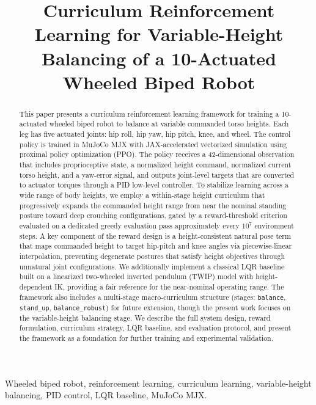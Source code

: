 \documentclass[conference]{IEEEtran}
\title{Curriculum Reinforcement Learning for Variable-Height Balancing of a 10-Actuated Wheeled Biped Robot}
\author{
\IEEEauthorblockN{Van Thuong Nguyen}
\IEEEauthorblockA{
Independent Researcher\\
Email: vanthuong180702t@gmail.com
}
}
\begin{document}
\maketitle

\begin{abstract}
This paper presents a curriculum reinforcement learning framework for training a 10-actuated wheeled biped robot to balance at variable commanded torso heights.
Each leg has five actuated joints: hip roll, hip yaw, hip pitch, knee, and wheel.
The control policy is trained in MuJoCo MJX with JAX-accelerated vectorized simulation
using proximal policy optimization (PPO).
The policy receives a 42-dimensional observation that includes proprioceptive state,
a normalized height command, normalized current torso height, and a yaw-error
signal, and outputs joint-level targets that are converted to actuator torques
through a PID low-level controller.
To stabilize learning across a wide range of body heights, we employ a within-stage
height curriculum that progressively expands the commanded height range from
near the nominal standing posture toward deep crouching configurations, gated
by a reward-threshold criterion evaluated on a dedicated greedy evaluation pass
approximately every $10^7$ environment steps.
A key component of the reward design is a height-consistent natural pose term
that maps commanded height to target hip-pitch and knee angles via
piecewise-linear interpolation, preventing degenerate postures that satisfy
height objectives through unnatural joint configurations.
We additionally implement a classical LQR baseline built on a linearized
two-wheeled inverted pendulum (TWIP) model with height-dependent IK,
providing a fair reference for the near-nominal operating range.
The framework also includes a multi-stage macro-curriculum structure
(stages: \texttt{balance}, \texttt{stand\_up}, \texttt{balance\_robust})
for future extension, though the present work focuses on the variable-height
balancing stage.
We describe the full system design, reward formulation, curriculum strategy,
LQR baseline, and evaluation protocol, and present the framework as a foundation
for further training and experimental validation.
\end{abstract}

\begin{IEEEkeywords}
Wheeled biped robot, reinforcement learning, curriculum learning, variable-height balancing,
PID control, LQR baseline, MuJoCo MJX.
\end{IEEEkeywords}
\end{document}
